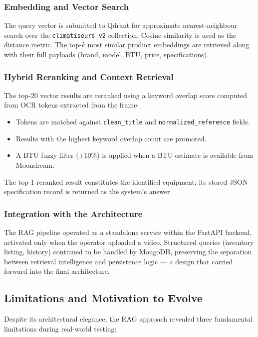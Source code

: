 \subsubsection{Embedding and Vector Search}
The query vector is submitted to Qdrant for approximate nearest-neighbour search over the \texttt{climatiseurs\_v2} collection. Cosine similarity is used as the distance metric. The top-$k$ most similar product embeddings are retrieved along with their full payloads (brand, model, BTU, price, specifications).

\subsubsection{Hybrid Reranking and Context Retrieval}
The top-20 vector results are reranked using a keyword overlap score computed from OCR tokens extracted from the frame:
\begin{itemize}
  \item Tokens are matched against \texttt{clean\_title} and \texttt{normalized\_reference} fields.
  \item Results with the highest keyword overlap count are promoted.
  \item A BTU fuzzy filter ($\pm 10\%$) is applied when a BTU estimate is available from Moondream.
\end{itemize}
The top-1 reranked result constitutes the identified equipment; its stored JSON specification record is returned as the system's answer.

\subsubsection{Integration with the Architecture}
The RAG pipeline operated as a standalone service within the FastAPI backend, activated only when the operator uploaded a video. Structured queries (inventory listing, history) continued to be handled by MongoDB, preserving the separation between retrieval intelligence and persistence logic — a design that carried forward into the final architecture.

\subsection{Limitations and Motivation to Evolve}

Despite its architectural elegance, the RAG approach revealed three fundamental limitations during real-world testing:

